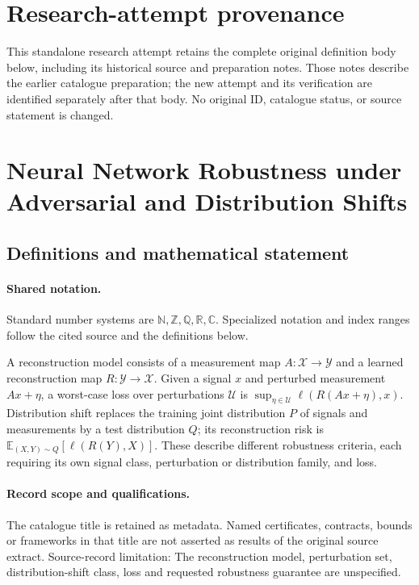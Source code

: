 \documentclass[11pt]{article}
\begin{document}
\section*{Research-attempt provenance}
This standalone research attempt retains the complete original definition body below,
including its historical source and preparation notes. Those notes describe the
earlier catalogue preparation; the new attempt and its verification are identified
separately after that body. No original ID, catalogue status, or source statement is changed.

\section{Neural Network Robustness under Adversarial and Distribution Shifts}\label{statement}

\subsection{Definitions and mathematical statement}

\paragraph{Shared notation.}Standard number systems are $\mathbb N,\mathbb Z,\mathbb Q,\mathbb R,\mathbb C$. Specialized notation and index ranges follow the cited source and the definitions below.


A reconstruction model consists of a measurement map $A:\mathcal X\to\mathcal Y$ and a learned reconstruction map $R:\mathcal Y\to\mathcal X$. Given a signal $x$ and perturbed measurement $Ax+\eta$, a worst-case loss over perturbations $\mathcal U$ is $\sup_{\eta\in\mathcal U}\ell(R(Ax+\eta),x)$. Distribution shift replaces the training joint distribution $P$ of signals and measurements by a test distribution $Q$; its reconstruction risk is $\mathbb E_{(X,Y)\sim Q}[\ell(R(Y),X)]$. These describe different robustness criteria, each requiring its own signal class, perturbation or distribution family, and loss.
\paragraph{Record scope and qualifications.}
The catalogue title is retained as metadata. Named certificates, contracts, bounds or frameworks in that title are not asserted as results of the original source extract.
Source-record limitation: The reconstruction model, perturbation set, distribution-shift class, loss and requested robustness guarantee are unspecified.
\end{document}
